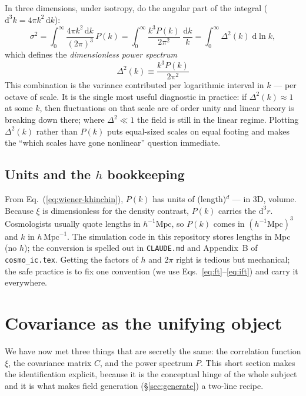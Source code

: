 \documentclass[12pt]{article}
\newcommand{\code}[1]{\texttt{#1}}
\begin{document}
In three dimensions, under isotropy, do the angular part of the integral
($\mathrm d^3 k = 4\pi k^2\,\mathrm d k$):
\begin{equation}
  \sigma^2 = \int_0^\infty \frac{4\pi k^2\,\mathrm d k}{(2\pi)^3}\,P(k)
           = \int_0^\infty \frac{k^3 P(k)}{2\pi^2}\;\frac{\mathrm d k}{k}
           = \int_0^\infty \Delta^2(k)\;\mathrm d\ln k,
  \label{eq:dimensionless}
\end{equation}
which defines the \emph{dimensionless power spectrum}
\begin{equation}
  \boxed{\;\Delta^2(k) \equiv \frac{k^3 P(k)}{2\pi^2}\;}
  \label{eq:Delta2}
\end{equation}
This combination is the variance contributed per logarithmic interval in
$k$ --- per octave of scale.  It is the single most useful diagnostic in
practice: if $\Delta^2(k) \approx 1$ at some $k$, then fluctuations on
that scale are of order unity and linear theory is breaking down there;
where $\Delta^2 \ll 1$ the field is still in the linear regime.  Plotting
$\Delta^2(k)$ rather than $P(k)$ puts equal-sized scales on equal
footing and makes the ``which scales have gone nonlinear'' question
immediate.

\subsection{Units and the $h$ bookkeeping}
From Eq.~(\ref{eq:wiener-khinchin}), $P(k)$ has units of
(length)$^d$ --- in 3D, volume.  Because $\xi$ is dimensionless for the
density contrast, $P(k)$ carries the $\mathrm d^3 r$.  Cosmologists
usually quote lengths in $h^{-1}\mathrm{Mpc}$, so $P(k)$ comes in
$(h^{-1}\mathrm{Mpc})^3$ and $k$ in $h\,\mathrm{Mpc}^{-1}$.  The
simulation code in this repository stores lengths in Mpc (no $h$); the
conversion is spelled out in \code{CLAUDE.md} and Appendix~B of
\code{cosmo\_ic.tex}.  Getting the factors of $h$ and $2\pi$ right is
tedious but mechanical; the safe practice is to fix one convention (we
use Eqs.~\ref{eq:ft}--\ref{eq:ift}) and carry it everywhere.

\section{Covariance as the unifying object}
\label{sec:covariance}

We have now met three things that are secretly the same: the correlation
function $\xi$, the covariance matrix $C$, and the power spectrum $P$.
This short section makes the identification explicit, because it is the
conceptual hinge of the whole subject and it is what makes field
generation (\S\ref{sec:generate}) a two-line recipe.
\end{document}
